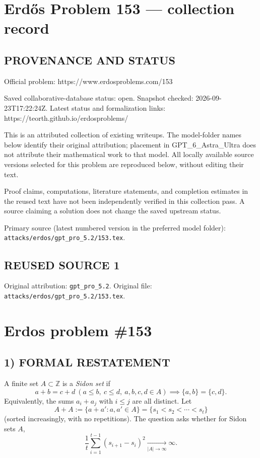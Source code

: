 \section*{Erd\H{o}s Problem 153 --- collection record}

\subsection*{PROVENANCE AND STATUS}
Official problem: https://www.erdosproblems.com/153

Saved collaborative-database status: open.
Snapshot checked: 2026-09-23T17:22:24Z.
Latest status and formalization links: https://teorth.github.io/erdosproblems/

This is an attributed collection of existing writeups. The model-folder names below identify their original attribution; placement in GPT\_6\_Astra\_Ultra does not attribute their mathematical work to that model. All locally available source versions selected for this problem are reproduced below, without editing their text.

Proof claims, computations, literature statements, and completion estimates in the reused text have not been independently verified in this collection pass. A source claiming a solution does not change the saved upstream status.

Primary source (latest numbered version in the preferred model folder): \texttt{attacks/erdos/gpt\_pro\_5.2/153.tex}.

\subsection*{REUSED SOURCE 1}
Original attribution: \texttt{gpt\_pro\_5.2}.
Original file: \texttt{attacks/erdos/gpt\_pro\_5.2/153.tex}.


\section*{Erdos problem \#153}

\subsection*{1) FORMAL RESTATEMENT}
A finite set $A\subset\mathbb Z$ is a \emph{Sidon set} if
\[
 a+b=c+d\ (a\le b,\ c\le d,\ a,b,c,d\in A)\implies \{a,b\}=\{c,d\}.
\]
Equivalently, the sums $a_i+a_j$ with $i\le j$ are all distinct.
Let
\[
A+A:=\{a+a':a,a'\in A\}=\{s_1<s_2<\cdots<s_t\}
\]
(sorted increasingly, with no repetitions). The question asks whether for Sidon sets $A$,
\[
\frac{1}{t}\sum_{i=1}^{t-1}(s_{i+1}-s_i)^2\xrightarrow[|A|\to\infty]{}\infty.
\]

